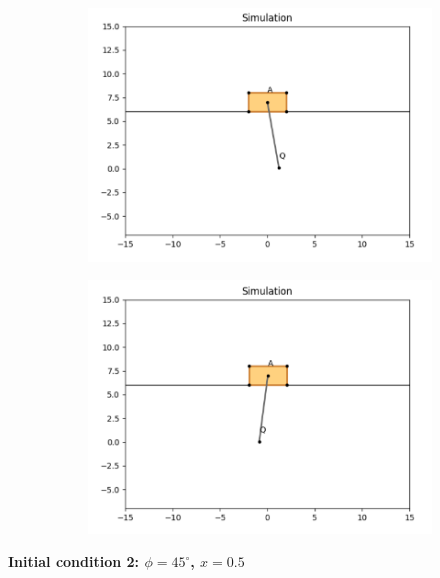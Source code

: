 \documentclass{article}
\begin{document}
\begin{figure}[htbp]
  \centering
  \begin{subfigure}[t]{0.45\linewidth}
    \centering
    \includegraphics[width=\linewidth]{simulation/init1_1.png}
    \caption{}
  \end{subfigure}
  \begin{subfigure}[t]{0.45\linewidth}
    \centering
    \includegraphics[width=\linewidth]{simulation/init1_2.png}
    \caption{}
  \end{subfigure}
\end{figure}

\textbf{Initial condition 2: $\phi = 45^\circ$, $x = 0.5$}
\end{document}
